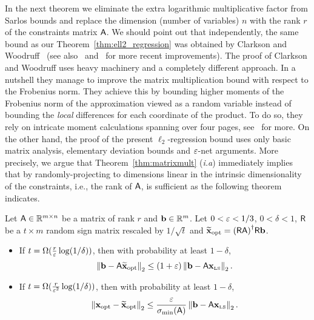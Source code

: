 %
In the next theorem we eliminate the extra logarithmic multiplicative factor from Sarlos bounds and replace the dimension (number of variables) $n$ with the rank $r$ of the constraints matrix ${\mathsf{A} }$. We should point out that independently, the same bound as our Theorem~\ref{thm:ell2_regression} was obtained by Clarkson and Woodruff~\cite{CW_stoc09} (see also~\cite{fasterLS} and~\cite{ls:nnzA} for more recent improvements). The proof of Clarkson and Woodruff uses heavy machinery and a completely different approach. In a nutshell they manage to improve the matrix multiplication bound with respect to the Frobenius norm. They achieve this by bounding higher moments of the Frobenius norm of the approximation  viewed as a random variable instead of bounding the \emph{local} differences for each coordinate of the product. To do so, they rely on intricate moment calculations spanning over four pages, see~\cite{CW_stoc09} for more. On the other hand, the proof of the present $\ell_2$-regression bound uses only basic matrix analysis, elementary deviation bounds and $\varepsilon$-net arguments. More precisely, we argue that Theorem~\ref{thm:matrixmult} (\textit{i.a}) immediately implies that by randomly-projecting to dimensions linear in the intrinsic dimensionality of the constraints, i.e., the rank of ${\mathsf{A} }$, is sufficient as the following theorem indicates.
\begin{theorem}\label{thm:ell2_regression}
Let ${\mathsf{A} }\in{\mathbb{R}^{m\times n}}$ be a matrix of rank $r$ and ${\mathbf b}\in\mathbb{R}^m$. Let $0<\varepsilon<1/3$, $0<\delta <1$, ${\mathsf{R} }$ be a $t\times m$ random sign matrix rescaled by $1/\sqrt{t}$ and $\widetilde{\mathbf{x}}_{\text{opt}}={({\mathsf{R} }{\mathsf{A} })}^\dagger {\ensuremath{\mathsf{R} }}{\mathbf b}$.
\begin{itemize}
 \item
If $t=\Omega(\frac{r}{\varepsilon}\log (1/\delta))$, then with probability at least $1-\delta$,
\begin{equation}\label{ineq:regression:approx}
 \left\|{\mathbf b}-{\mathsf{A} }\widetilde{\mathbf{x}}_{\text{opt}}\right\|_2 \leq (1+\varepsilon) \left\|{\mathbf b}-{\mathsf{A} } \mathbf{x}_{\textrm{\tiny LS}} \right\|_2.
\end{equation}
\item
If $t=\Omega(\frac{r}{\varepsilon^2}\log(1/\delta))$, then with probability at least $1-\delta$,
\begin{equation}\label{ineq:regression:x_opt}
 \left\|\mathbf{x}_{\text{opt}} - \widetilde{\mathbf{x}}_{\text{opt}}\right\|_2 \leq \dfrac{\varepsilon}{\sigma_{\min}({\mathsf{A} })}\left\|{\mathbf b}-{\mathsf{A} }\mathbf{x}_{\textrm{\tiny LS}}\right\|_2.
\end{equation}
\end{itemize}
\end{theorem}
